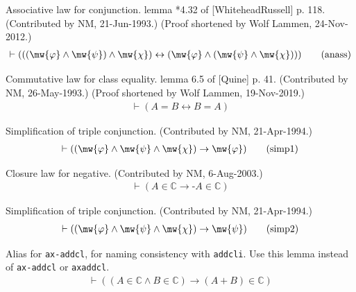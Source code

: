 \begin{lemma} Associative law for conjunction.  lemma
*4.32 of [WhiteheadRussell]
     p. 118.  (Contributed by NM, 21-Jun-1993.)  (Proof shortened by Wolf
     Lammen, 24-Nov-2012.)
\begin{align}
\vdash ( ( ( \mw{\varphi} \wedge \mw{\psi} ) \wedge \mw{\chi} ) \leftrightarrow
    ( \mw{\varphi} \wedge ( \mw{\psi} \wedge \mw{\chi} ) )
    )\label{eq:anass}\tag{anass}
\end{align}
\end{lemma}


\begin{lemma} Commutative law for class equality.  lemma
6.5 of [Quine] p. 41.
     (Contributed by NM, 26-May-1993.)  (Proof shortened by Wolf Lammen,
     19-Nov-2019.)
\begin{align}
\vdash ( A = B \leftrightarrow B = A )\label{eq:eqcom}\tag{eqcom}
\end{align}
\end{lemma}


\begin{lemma} Simplification of triple conjunction. 
(Contributed by NM,
     21-Apr-1994.)
\begin{align}
\vdash ( ( \mw{\varphi} \wedge \mw{\psi} \wedge \mw{\chi} ) \rightarrow
    \mw{\varphi} )\label{eq:simp1}\tag{simp1}
\end{align}
\end{lemma}


\begin{lemma} Closure law for negative.  (Contributed by
NM, 6-Aug-2003.)
\begin{align}
\vdash ( A \in \mathbb{C} \rightarrow \textrm{-} A \in \mathbb{C}
    )\label{eq:negcl}\tag{negcl}
\end{align}
\end{lemma}


\begin{lemma} Simplification of triple conjunction. 
(Contributed by NM,
     21-Apr-1994.)
\begin{align}
\vdash ( ( \mw{\varphi} \wedge \mw{\psi} \wedge \mw{\chi} ) \rightarrow
    \mw{\psi} )\label{eq:simp2}\tag{simp2}
\end{align}
\end{lemma}


\begin{lemma} Alias for {\tt ax-addcl}, for naming
consistency with {\tt addcli}.  Use this
     lemma instead of {\tt ax-addcl} or {\tt axaddcl}.  %
\begin{align}
\vdash ( ( A \in \mathbb{C} \wedge B \in \mathbb{C} ) \rightarrow ( A + B ) \in
    \mathbb{C} )\label{eq:addcl}\tag{addcl}
\end{align}
\end{lemma}



